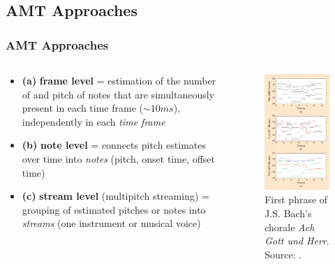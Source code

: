 \documentclass{beamer}
\newcommand{\emp}[1]{\textcolor{tum}{\textbf{#1}}}
\begin{document}
\subsection{AMT Approaches}
\begin{frame}[shrink=10]
	\frametitle{AMT Approaches}

	\begin{columns}
		\begin{column}{0.5\textwidth}
			\begin{itemize}
				\item \emp{(a)} \textbf{frame level} = estimation of the number of and pitch of notes that are simultaneously present in each time frame ($\sim 10ms$), independently in each \textit{time frame}
				      \vspace{2mm}
				\item \emp{(b)} \textbf{note level} = connects pitch estimates over time into \textit{notes} (pitch, onset time, offset time)
				      \vspace{2mm}
				\item \emp{(c)} \textbf{stream level} (multipitch streaming) = grouping of estimated pitches or notes into \textit{streams} (one instrument or musical voice)
			\end{itemize}
		\end{column}

		\begin{column}{0.5\textwidth}
			\begin{figure}[!ht]
				\centering
				\includegraphics[width=.6\textwidth]{transcriptions.png}
				\caption{First phrase of J.S. Bach's chorale \textit{Ach Gott und Herr}. Source: \cite{Overview}.}
				\label{fig:transcriptions}
			\end{figure}
		\end{column}
	\end{columns}

\end{frame}
\end{document}
